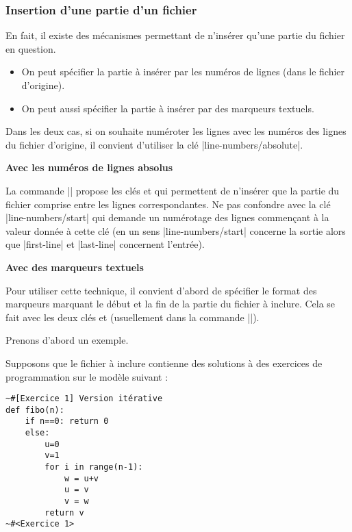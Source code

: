 \documentclass[dvipsnames,svgnames]{article}
\begin{document}
\subsubsection{Insertion d'une partie d'un fichier}

\label{part-of-a-file}

En fait, il existe des mécanismes permettant de n'insérer qu'une partie du fichier en
question.
\begin{itemize}
\item On peut spécifier la partie à insérer par les numéros de lignes (dans le fichier
d'origine).
\item On peut aussi spécifier la partie à insérer par des marqueurs textuels.
\end{itemize}
Dans les deux cas, si on souhaite numéroter les lignes avec les numéros des lignes du
fichier d'origine, il convient d'utiliser la clé |line-numbers/absolute|.

\bigskip
\textbf{Avec les numéros de lignes absolus}

\nobreak
La commande |\PitonInputFile| propose les clés  et
 qui permettent de n'insérer que la partie du fichier comprise entre
les lignes correspondantes. Ne pas confondre avec la clé |line-numbers/start| qui demande
un numérotage des lignes commençant à la valeur donnée à cette clé (en un sens
|line-numbers/start| concerne la sortie alors que |first-line| et |last-line| concernent
l'entrée).

\bigskip
\textbf{Avec des marqueurs textuels}


\nobreak
Pour utiliser cette technique, il convient d'abord de spécifier le format des marqueurs
marquant le début et la fin de la partie du fichier à inclure. Cela se fait avec les deux
clés  et  (usuellement dans la
commande |\PitonOptions|).

\medskip
Prenons d'abord un exemple.

\medskip
Supposons que le fichier à inclure contienne des solutions à des exercices de
programmation sur le modèle suivant :

\begin{Verbatim}[formatcom=\small\color{gray}]
~#[Exercice 1] Version itérative
def fibo(n):
    if n==0: return 0 
    else:
        u=0
        v=1
        for i in range(n-1):
            w = u+v
            u = v
            v = w
        return v
~#<Exercice 1>
\end{Verbatim}
\end{document}

